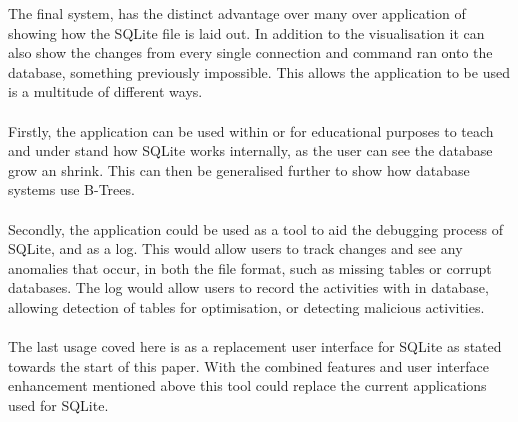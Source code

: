 The final system, has the distinct advantage over many over application of showing how the SQLite file is laid out. In addition to the visualisation it can also show the changes from every single connection and command ran onto the database, something previously impossible. This allows the application to be used is a multitude of different ways.
\\\\
Firstly, the application can be used within or for educational purposes to teach and under stand how SQLite works internally, as the user can see the database grow an shrink. This can then be generalised further to show how database systems use B-Trees. 
\\\\
Secondly, the application could be used as a tool to aid the debugging process of SQLite, and as a log. This would allow users to track changes and see any anomalies that occur, in both the file format, such as missing tables or corrupt databases. The log would allow users to record the activities with in database, allowing detection of tables for optimisation, or detecting malicious activities.
\\\\
The last usage coved here is as a replacement user interface for SQLite as stated towards the start of this paper. With the combined features and user interface enhancement mentioned above this tool could replace the current applications used for SQLite. 